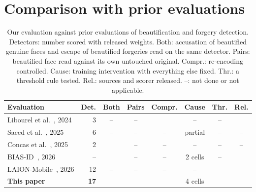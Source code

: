 \documentclass[10pt]{article}
\newcommand{\cmark}{\checkmark}
\newcommand{\xmark}{--}
\begin{document}
\section{Comparison with prior evaluations}
\label{sec:compare}
\begin{table}[H]
\centering
\caption{Our evaluation against prior evaluations of beautification and forgery detection. Detectors: number scored with
released weights. Both: accusation of beautified genuine faces and escape of beautified forgeries read on the same detector.
Pairs: beautified face read against its own untouched original. Compr.: re-encoding controlled. Cause: training intervention
with everything else fixed. Thr.: a threshold rule tested. Rel.: sources and scorer released. --: not done or not applicable.}
\label{tab:compare}
\footnotesize
\setlength{\tabcolsep}{3.5pt}
\begin{tabular}{@{}l r c c c c c c@{}}
\toprule
Evaluation & Det. & Both & Pairs & Compr. & Cause & Thr. & Rel. \\
\midrule
Libourel et al.~\cite{libourel2024}, 2024 & 3 & \xmark & \xmark & \cmark & \xmark & \xmark & \cmark \\
Saeed et al.~\cite{saeed2025}, 2025 & 6 & \xmark & \xmark & \xmark & partial & \xmark & \xmark \\
Concas et al.~\cite{concas2025}, 2025 & 2 & \cmark & \xmark & \xmark & \xmark & \xmark & \xmark \\
BIAS-ID~\cite{ricker2026biasid}, 2026 & -- & \cmark & \xmark & \xmark & 2 cells & \xmark & \cmark \\
LAION-Mobile~\cite{laionmobile2026}, 2026 & 12 & \xmark & \xmark & \xmark & \xmark & \cmark & \cmark \\
\textbf{This paper} & \textbf{17} & \cmark & \cmark & \cmark & 4 cells & \cmark & \cmark \\
\bottomrule
\end{tabular}
\end{table}
\end{document}
